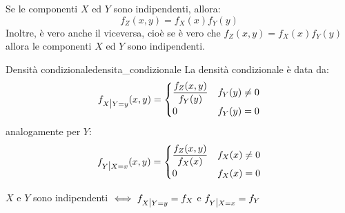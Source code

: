 \documentclass[12pt]{report}
\newcounter{definition}
\newcommand{\nmu}{}
\begin{document}
	\begin{note}{}{}
		Se le componenti $X$ ed $Y$ sono indipendenti, allora:
		\[
		f_Z(x, y) = f_X(x)f_Y(y)
		\]
		Inoltre, è vero anche il viceversa, cioè se è vero che $f_Z(x, y) = f_X(x)f_Y(y)$ allora le componenti $X$ ed $Y$ sono indipendenti.
	\end{note}
	\begin{definition}{\nmu Densità condizionale}{densita_condizionale}
		La densità condizionale è data da:
		\[
		f_{X \mathlarger{\mid} Y=y}(x, y) = \begin{cases}
			\dfrac{f_Z(x, y)}{f_Y(y)} & f_Y(y) \neq 0\\
			0 & f_Y(y) = 0
		\end{cases}
		\]
		analogamente per $Y$:
		\[
		f_{Y \mathlarger{\mid} X=x}(x, y) = \begin{cases}
			\dfrac{f_Z(x, y)}{f_X(x)} & f_X(x) \neq 0\\
			0 & f_X(x) = 0
		\end{cases}
		\]

	\end{definition}
	\begin{note}{}{}
		$X$ e $Y$ sono indipendenti $\iff f_{X \mathlarger{\mid} Y=y} = f_X$ e $f_{Y \mathlarger{\mid} X=x} = f_Y$
	\end{note}
\end{document}
